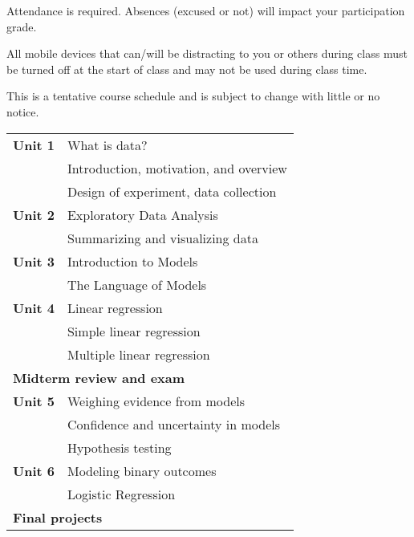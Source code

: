 \documentclass[10pt]{article}
\begin{document}

\noindent Attendance is required. Absences (excused or not) will impact your participation grade.

\noindent All mobile devices that can/will be distracting to you or others during class must be turned off at the start of class and may not be used during class time.
%  
%  

\bigskip
{}

\noindent This is a tentative course schedule and is subject to change with little or no notice.

\begin{table}[htp]
\begin{tabular}{ll}
\bf Unit 1 & What is data?\\
       & Introduction, motivation, and overview \\
       & Design of experiment, data collection\\
\bf Unit 2 & Exploratory Data Analysis\\
       & Summarizing and visualizing data \\
\bf Unit 3 & Introduction to Models\\
       & The Language of Models\\
\bf Unit 4 & Linear regression \\
       & Simple linear regression \\
       & Multiple linear regression \\
\multicolumn{2}{l}{\bf Midterm review and exam}\\
\bf Unit 5 & Weighing evidence from models\\
       & Confidence and uncertainty in models\\
       & Hypothesis testing\\

\bf Unit 6 & Modeling binary outcomes \\ 
       & Logistic Regression\\

\multicolumn{2}{l}{\bf Final projects}
\end{tabular}
\end{table}%
\end{document}
